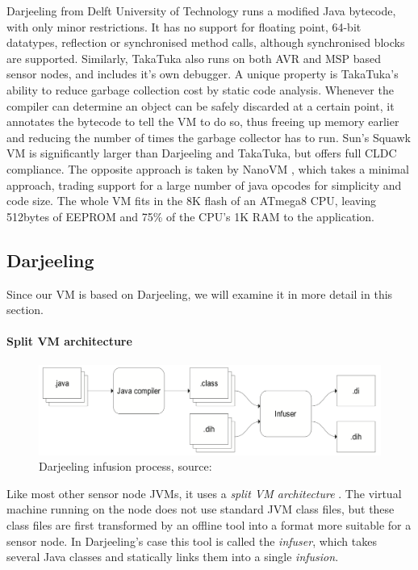 Darjeeling \cite{Brouwers:2009cj} from Delft University of Technology runs a modified Java bytecode, with only minor restrictions. It has no support for floating point, 64-bit datatypes, reflection or synchronised method calls, although synchronised blocks are supported. Similarly, TakaTuka \cite{Aslam:2008} also runs on both AVR and MSP based sensor nodes, and includes it's own debugger. A unique property is TakaTuka's ability to reduce garbage collection cost by static code analysis. Whenever the compiler can determine an object can be safely discarded at a certain point, it annotates the bytecode to tell the VM to do so, thus freeing up memory earlier and reducing the number of times the garbage collector has to run. Sun's Squawk VM \cite{Shaylor:2003ws} is significantly larger than Darjeeling and TakaTuka, but offers full CLDC compliance. The opposite approach is taken by NanoVM \cite{Harbaum}, which takes a minimal approach, trading support for a large number of java opcodes for simplicity and code size. The whole VM fits in the 8K flash of an ATmega8 CPU, leaving 512bytes of EEPROM and 75\% of the CPU's 1K RAM to the application.

\subsection{Darjeeling}
Since our VM is based on Darjeeling, we will examine it in more detail in this section.

\paragraph{Split VM architecture}
\begin{figure}
\centering
\includegraphics[width=0.6\linewidth]{darjeeling-infusion-process}
\caption[Darjeeling infusion process]{Darjeeling infusion process, source: \cite{Brouwers:2009cj}}
\label{fig-darjeeling-infusion-process}
\end{figure}
Like most other sensor node JVMs, it uses a \emph{split VM architecture} \cite{Simon:2006wd}. The virtual machine running on the node does not use standard JVM class files, but these class files are first transformed by an offline tool into a format more suitable for a sensor node. In Darjeeling's case this tool is called the \emph{infuser}, which takes several Java classes and statically links them into a single \emph{infusion}.


